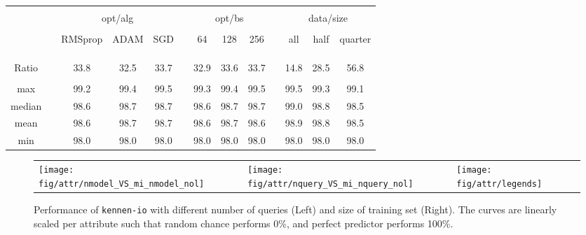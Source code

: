 \documentclass{article} %
\newcommand{\ORIC}{\texttt{kennen-io}\xspace}
\begin{document}
\begin{table}
\begin{centering}
\begin{tabular}{cc*{3}{c}c*{3}{c}c*{3}{c}}
\hspace{-0.8em} & \tabularnewline
 & \hspace{1em} & \multicolumn{3}{c}{opt/alg} && \multicolumn{3}{c}{opt/bs} && \multicolumn{3}{c}{data/size} \tabularnewline
\cline{3-5} \cline{7-9} \cline{11-13} 
\vspace{-1em} &\tabularnewline
 &  & RMSprop & ADAM & SGD & \hspace{0.5em} & 64 & 128 & 256 & \hspace{0.5em} & all & half & quarter \tabularnewline
\vspace{-1em} &   \tabularnewline
\cline{1-1}\cline{3-5} \cline{7-9} \cline{11-13}
\vspace{-1em} &   \tabularnewline
\cline{1-1}\cline{3-5} \cline{7-9} \cline{11-13}
\vspace{-0.8em} &   \tabularnewline
Ratio   && 33.8 & 32.5 & 33.7 && 32.9 & 33.6 & 33.7 && 14.8 & 28.5 & 56.8  \tabularnewline
\cline{1-1}\cline{3-5} \cline{7-9} \cline{11-13}
\vspace{-0.8em} &   \tabularnewline
max    && 99.2 & 99.4 & 99.5 && 99.3 & 99.4 & 99.5 && 99.5 & 99.3 & 99.1  \tabularnewline
median && 98.6 & 98.7 & 98.7 && 98.6 & 98.7 & 98.7 && 99.0 & 98.8 & 98.5 \tabularnewline
mean   &&  98.6 & 98.7 & 98.7 && 98.6 & 98.7 & 98.6 && 98.9 & 98.8 & 98.5  \tabularnewline
min    && 98.0 & 98.0 & 98.0 && 98.0 & 98.0 & 98.0 && 98.0 & 98.0 & 98.0  \tabularnewline
\cline{1-1}\cline{3-5} \cline{7-9} \cline{11-13}
\end{tabular}
\par\end{centering}
\vspace{0em}
\end{table}

\begin{figure}
\begin{centering}
\setlength{\tabcolsep}{1em}
\begin{tabular}{ >{\centering\arraybackslash} m{12em} >{\centering\arraybackslash} m{12em}  >{\centering\arraybackslash} m{8em} }
\texttt{[image: fig/attr/nmodel\_VS\_mi\_nmodel\_nol]}
&
\texttt{[image: fig/attr/nquery\_VS\_mi\_nquery\_nol]}
&
\texttt{[image: fig/attr/legends]}
\end{tabular}
\par\end{centering}
\caption{\label{fig:attr-oric-nquery-nmodel}Performance of \ORIC with different number of queries (Left) and size of training set (Right). The curves are linearly scaled per attribute such that random chance performs 0\%, and perfect predictor performs 100\%.}
\end{figure}
\end{document}
